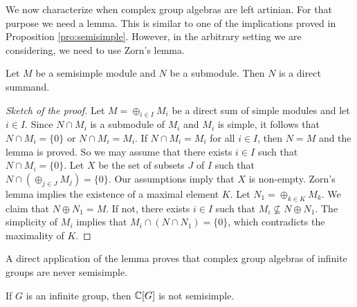 


We now characterize when complex group algebras 
are left artinian. For that purpose
we need a lemma. This is similar to one of the implications proved in Proposition \ref{pro:semisimple}. However,
in the arbitrary setting we are considering, we need to use Zorn's lemma. 

\begin{lemma}
    Let $M$ be a semisimple module and $N$ be a submodule. 
    Then $N$ is a direct summand.
\end{lemma}

\begin{proof}[Sketch of the proof]
    Let $M=\oplus_{i\in I}M_i$ be a direct sum of simple modules  
    and let $i\in I$. 
    Since $N\cap M_i$ is a submodule of $M_i$ and $M_i$ is simple, it follows
    that $N\cap M_i=\{0\}$ or $N\cap M_i=M_i$. If
    $N\cap M_i=M_i$ for all $i\in I$, then $N=M$ and the lemma is proved. So we may assume
    that there exists $i\in I$ such that $N\cap M_i=\{0\}$. Let $X$ be the set
    of subsets $J$ of $I$ such that $N\cap (\oplus_{j\in J}M_j)=\{0\}$. Our assumptions
    imply that $X$ is non-empty. Zorn's lemma implies the existence of 
    a maximal element $K$. Let $N_1=\oplus_{k\in K}M_k$. We claim that
    $N\oplus N_1=M$. If not, there exists $i\in I$ such that
    $M_i\not\subseteq N\oplus N_1$. The simplicity of $M_i$ implies that
    $M_i\cap (N\cap N_1)=\{0\}$, which contradicts the maximality of $K$. 
\end{proof}

A direct application of the lemma proves that
complex group algebras of infinite groups are never semisimple. 

\begin{proposition}
    \label{pro:KGsemisimple}
    If $G$ is an infinite group, then $\mathbb{C}[G]$ is not semisimple. 
\end{proposition}

